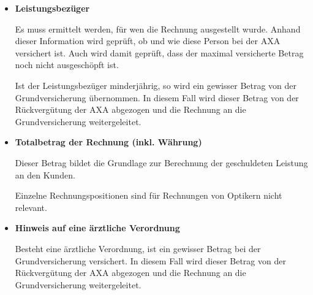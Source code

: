 \begin{itemize}
    \item \textbf{Leistungsbezüger}
    
    Es muss ermittelt werden, für wen die Rechnung ausgestellt wurde. Anhand dieser Information wird geprüft, ob und wie diese Person bei der AXA versichert ist. Auch wird damit geprüft, dass der maximal versicherte Betrag noch nicht ausgeschöpft ist.
    
    Ist der Leistungsbezüger minderjährig, so wird ein gewisser Betrag von der Grundversicherung übernommen. In diesem Fall wird dieser Betrag von der Rückvergütung der AXA abgezogen und die Rechnung an die Grundversicherung weitergeleitet.
    
    \item \textbf{Totalbetrag der Rechnung (inkl. Währung)}
    
    Dieser Betrag bildet die Grundlage zur Berechnung der geschuldeten Leistung an den Kunden. 
    
    Einzelne Rechnungspositionen sind für Rechnungen von Optikern nicht relevant.
    
    \item \textbf{Hinweis auf eine ärztliche Verordnung}
    
    Besteht eine ärztliche Verordnung, ist ein gewisser Betrag bei der Grundversicherung versichert. In diesem Fall wird dieser Betrag von der Rückvergütung der AXA abgezogen und die Rechnung an die Grundversicherung weitergeleitet.
\end{itemize}



%    
%    
%    
%    

